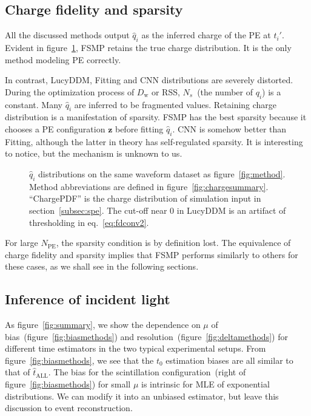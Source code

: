 \subsection{Charge fidelity and sparsity}

All the discussed methods output $\hat{q}_i$ as the inferred charge of the PE at $t_i'$.  Evident in figure~\ref{fig:recchargehist}, FSMP retains the true charge distribution.  It is the only method modeling PE correctly.

In contrast, LucyDDM, Fitting and CNN distributions are severely distorted.  During the optimization process of $D_\mathrm{w}$ or RSS, $N_s$~(the number of $q_i$) is a constant. Many $\hat{q}_i$ are inferred to be fragmented values.  Retaining charge distribution is a manifestation of sparsity.  FSMP has the best sparsity because it chooses a PE configuration $\bm{z}$ before fitting $\hat{q}_i$.  CNN is somehow better than Fitting, although the latter in theory has self-regulated sparsity.  It is interesting to notice, but the mechanism is unknown to us.

\begin{figure}[H]
  \centering
  \resizebox{0.6\textwidth}{!}{}
  \caption{\label{fig:recchargehist} $\hat{q}_i$ distributions on the same waveform dataset as figure~\ref{fig:method}.  Method abbreviations are defined in figure~\ref{fig:chargesummary}. ``ChargePDF'' is the charge distribution of simulation input in section~\ref{subsec:spe}. The cut-off near 0 in LucyDDM is an artifact of thresholding in eq.~\eqref{eq:fdconv2}.}
\end{figure}

For large $N_\mathrm{PE}$, the sparsity condition is by definition lost.  The equivalence of charge fidelity and sparsity implies that FSMP performs similarly to others for these cases, as we shall see in the following sections.

\subsection{Inference of incident light}
\label{subsec:timeresolution}

As figure~\ref{fig:summary}, we show the dependence on $\mu$ of bias~(figure~\ref{fig:biasmethods}) and resolution~(figure~\ref{fig:deltamethods}) for different time estimators in the two typical experimental setups.  From figure~\ref{fig:biasmethods}, we see that the $t_0$ estimation biases are all similar to that of $\hat{t}_\mathrm{ALL}$. The bias for the scintillation configuration~(right of figure~\ref{fig:biasmethods}) for small $\mu$ is intrinsic for MLE of exponential distributions.  We can modify it into an unbiased estimator, but leave this discussion to event reconstruction.

